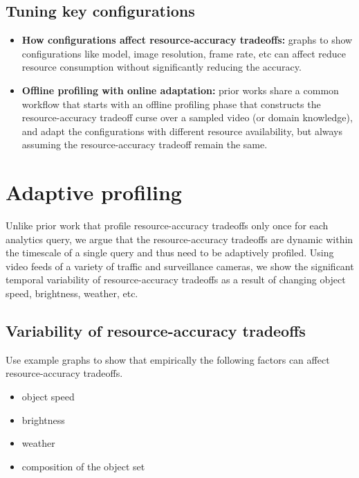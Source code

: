 \documentclass[letterpaper,twocolumn]{hotnets17}
\begin{document}
{\subsection{Tuning key configurations}
\begin{itemize}

\item {\bf How configurations affect resource-accuracy tradeoffs:} 
graphs to show configurations like model, image resolution, frame rate, etc can affect reduce resource consumption without significantly reducing the accuracy.

\item {\bf Offline profiling with online adaptation:} 
prior works share a common workflow that starts with an offline profiling phase that constructs the resource-accuracy tradeoff curse over a sampled video (or domain knowledge), and adapt the configurations with different resource availability, but always assuming the resource-accuracy tradeoff remain the same.

\end{itemize}

\section{Adaptive profiling}

Unlike prior work that profile resource-accuracy tradeoffs only once for each analytics query, we argue that the resource-accuracy tradeoffs are dynamic within the timescale of a single query and thus need to be adaptively profiled.
Using video feeds of a variety of traffic and surveillance cameras, we show the significant temporal variability of resource-accuracy tradeoffs as a result of changing object speed, brightness, weather, etc.

\subsection{Variability of resource-accuracy tradeoffs}
Use example graphs to show that empirically the following factors can affect resource-accuracy tradeoffs.
\begin{itemize}
\item object speed
\item brightness
\item weather
\item composition of the object set
\end{itemize}



}
\end{document}
